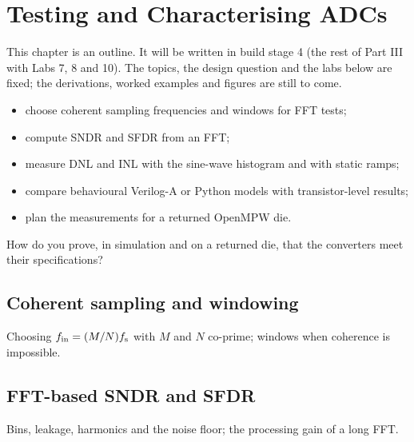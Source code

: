 \chapter{Testing and Characterising ADCs}\label{ch:adctest}

\begin{specnote}
This chapter is an outline. It will be written in build stage 4 (the rest of Part III with Labs 7, 8 and 10). The topics, the design question and the labs below are fixed; the derivations, worked examples and figures are still to come.
\end{specnote}

\begin{objectives}
\begin{itemize}
  \item choose coherent sampling frequencies and windows for FFT tests;
  \item compute SNDR and SFDR from an FFT;
  \item measure DNL and INL with the sine-wave histogram and with static ramps;
  \item compare behavioural Verilog-A or Python models with transistor-level results;
  \item plan the measurements for a returned OpenMPW die.
\end{itemize}
\end{objectives}

\begin{insight}
How do you prove, in simulation and on a returned die, that the \OB{} converters meet their specifications?
\end{insight}

\section{Coherent sampling and windowing}\label{sec:ch22-1}
Choosing $f_\mathrm{in} = (M/N)f_\mathrm{s}$ with $M$ and $N$ co-prime; windows when coherence is impossible.

\section{FFT-based SNDR and SFDR}\label{sec:ch22-2}
Bins, leakage, harmonics and the noise floor; the processing gain of a long FFT.

